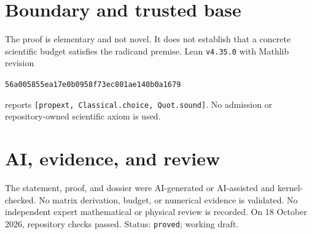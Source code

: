 \documentclass[11pt]{article}
\begin{document}
\section{Boundary and trusted base}
The proof is elementary and not novel. It does not establish that a concrete scientific
budget satisfies the radicand premise. Lean \texttt{v4.35.0} with Mathlib revision
\begin{center}\texttt{56a005855ea17e0b0958f73ec801ae140b0a1679}\end{center}
reports \texttt{[propext, Classical.choice, Quot.sound]}. No admission or
repository-owned scientific axiom is used.

\section{AI, evidence, and review}
The statement, proof, and dossier were AI-generated or AI-assisted and kernel-checked.
No matrix derivation, budget, or numerical evidence is validated. No independent expert
mathematical or physical review is recorded. On 18 October 2026, repository checks
passed. Status: \texttt{proved}; working draft.
\end{document}
